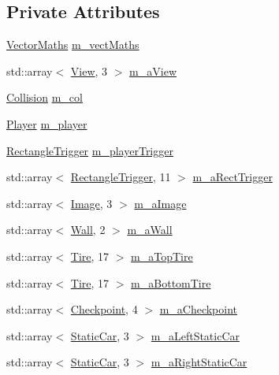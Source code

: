 \subsection*{Private Attributes}
\begin{DoxyCompactItemize}
\item 
\hyperlink{class_vector_maths}{Vector\+Maths} \hyperlink{class_game_a2f535f85fe3b454b9c708993753f4ecc}{m\+\_\+vect\+Maths}
\item 
std\+::array$<$ \hyperlink{class_view}{View}, 3 $>$ \hyperlink{class_game_a36d2bed14974b11445cb7a4da0256adf}{m\+\_\+a\+View}
\item 
\hyperlink{class_collision}{Collision} \hyperlink{class_game_ac35fe5a8537b15105621229bdfa0e282}{m\+\_\+col}
\item 
\hyperlink{class_player}{Player} \hyperlink{class_game_ad1f796902ca353bad4c877939e0005e7}{m\+\_\+player}
\item 
\hyperlink{class_rectangle_trigger}{Rectangle\+Trigger} \hyperlink{class_game_a007f25af28324cc117c00239be5c167b}{m\+\_\+player\+Trigger}
\item 
std\+::array$<$ \hyperlink{class_rectangle_trigger}{Rectangle\+Trigger}, 11 $>$ \hyperlink{class_game_a2065f8dee8f173a73ef904525ab6823e}{m\+\_\+a\+Rect\+Trigger}
\item 
std\+::array$<$ \hyperlink{class_image}{Image}, 3 $>$ \hyperlink{class_game_a5025f591142de524119d0dcc99300d3b}{m\+\_\+a\+Image}
\item 
std\+::array$<$ \hyperlink{class_wall}{Wall}, 2 $>$ \hyperlink{class_game_a3baabf1657a540fb01d7c256829f4221}{m\+\_\+a\+Wall}
\item 
std\+::array$<$ \hyperlink{class_tire}{Tire}, 17 $>$ \hyperlink{class_game_a3b92928693ffa8c38f8e11c032990def}{m\+\_\+a\+Top\+Tire}
\item 
std\+::array$<$ \hyperlink{class_tire}{Tire}, 17 $>$ \hyperlink{class_game_a15992ccedd036df35c2e8c14b70676ef}{m\+\_\+a\+Bottom\+Tire}
\item 
std\+::array$<$ \hyperlink{class_checkpoint}{Checkpoint}, 4 $>$ \hyperlink{class_game_ade427c88bcff6dd2e4b7e78a6db93f04}{m\+\_\+a\+Checkpoint}
\item 
std\+::array$<$ \hyperlink{class_static_car}{Static\+Car}, 3 $>$ \hyperlink{class_game_a664151ff15f6aaecc56b1c35e7fb05df}{m\+\_\+a\+Left\+Static\+Car}
\item 
std\+::array$<$ \hyperlink{class_static_car}{Static\+Car}, 3 $>$ \hyperlink{class_game_a53199784b896c76c8b6fc7663f92b334}{m\+\_\+a\+Right\+Static\+Car}
\item 

\end{DoxyCompactItemize}
